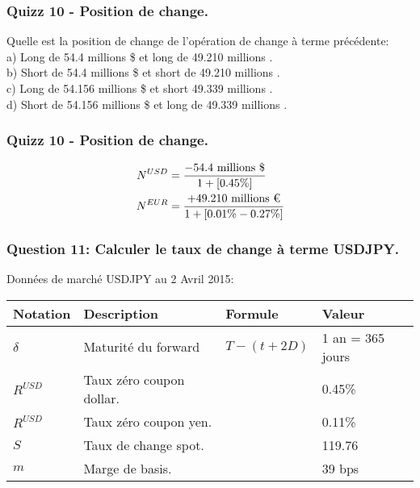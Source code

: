 \documentclass{beamer}
\begin{document}
\begin{frame}
\frametitle{Quizz 10 - Position de change.}
Quelle est la position de change de l'opération de change à terme précédente:\\
\vspace{0.5cm}
a) Long de 54.4 millions \$ et long de 49.210 millions \texteuro. \\
b) Short de 54.4 millions \$  et short de 49.210 millions \texteuro.\\
c) Long de 54.156 millions \$ et short 49.339 millions \texteuro.\\
d) Short de 54.156 millions \$ et long de 49.339 millions \texteuro.\\
\vspace{0.5cm}
\end{frame}

\begin{frame}
\frametitle{Quizz 10 - Position de change.}
\Large
\[
\begin{split}
N^{USD}&=\frac{-54.4 \text{ millions \$}}{1+[0.45\%]}\\
N^{EUR}&=\frac{+49.210 \text{ millions \texteuro}}{1+[0.01\%-0.27\%]}\\
\end{split}
\]
\end{frame}

\begin{frame}
\small
\frametitle{Question 11: Calculer le taux de change à terme USDJPY.}
Données de marché USDJPY au 2 Avril 2015:\\
\begin{center}
\begin{tabular}{|l|l|l|l|}
\hline
\textbf{Notation} & \textbf{Description} & \textbf{Formule} & \textbf{Valeur} \\
\hline
\hline
$\delta$ & Maturité du forward & $T-(t+2D)$ & 1 an = 365 jours \\
$R^{USD}$ & Taux zéro coupon dollar. &  & 0.45\% \\
$R^{USD}$ & Taux zéro coupon yen. &  & 0.11\% \\
$S$ & Taux de change spot. &  & 119.76 \\
$m$ & Marge de basis. &  & 39 bps \\
\hline
\end{tabular}
\end{center}
\end{frame}
\end{document}
